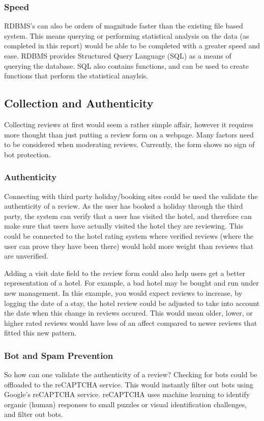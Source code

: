 \documentclass[a4paper]{article}
\begin{document}
\subsubsection{Speed}
RDBMS's can also be orders of magnitude faster than the existing file based system.
This means querying or performing statistical analysis on the data (as completed in this report) would be able to be completed with a greater speed and ease.
RDBMS provides Structured Query Language (SQL) as a means of querying the database.
SQL also contains functions, and can be used to create functions that perform the statistical anaylsis.


\subsection{Collection and Authenticity}
Collecting reviews at first would seem a rather simple affair, however it requires more thought than just putting a review form on a webpage.
Many factors need to be considered when moderating reviews.
Currently, the form shows no sign of bot protection.

\subsubsection{Authenticity}
Connecting with third party holiday/booking sites could be used the validate the authenticity of a review.
As the user has booked a holiday through the third party, the system can verify that a user has visited the hotel, and therefore can make sure that users have actually visited the hotel they are reviewing.
This could be connected to the hotel rating system where verified reviews (where the user can prove they have been there) would hold more weight than reviews that are unverified.

Adding a visit date field to the review form could also help users get a better representation of a hotel.
For example, a bad hotel may be bought and run under new management.
In this example, you would expect reviews to increase, by logging the date of a stay, the hotel review could be adjusted to take into account the date when this change in reviews occured.
This would mean older, lower, or higher rated reviews would have less of an affect compared to newer reviews that fitted this new pattern.

\subsubsection{Bot and Spam Prevention}
So how can one validate the authenticity of a review?
Checking for bots could be offloaded to the reCAPTCHA service.
This would instantly filter out bots using Google's reCAPTCHA service.
reCAPTCHA uses machine learning to identify organic (human) responses to small puzzles or visual identification challenges, and filter out bots.
\end{document}
